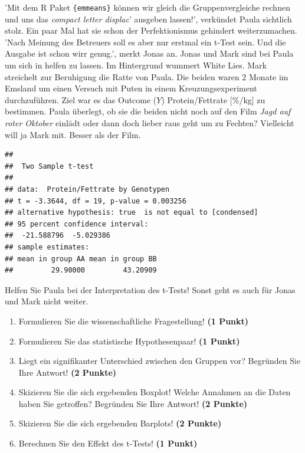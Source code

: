 \documentclass[a4paper, 9pt]{scrartcl}\usepackage[]{graphicx}\usepackage[]{xcolor}
\makeatletter
\newenvironment{kframe}{%
 \def\at@end@of@kframe{}%
 \ifinner\ifhmode%
  \def\at@end@of@kframe{\end{minipage}}%
  \begin{minipage}{\columnwidth}%
 \fi\fi%
 \def\FrameCommand##1{\hskip\@totalleftmargin \hskip-\fboxsep
 \colorbox{shadecolor}{##1}\hskip-\fboxsep
     \hskip-\linewidth \hskip-\@totalleftmargin \hskip\columnwidth}%
 \MakeFramed {\advance\hsize-\width
   \@totalleftmargin\z@ \linewidth\hsize
   \@setminipage}}%
 {\par\unskip\endMakeFramed%
 \at@end@of@kframe}
\newenvironment{knitrout}{}{} %
\makeatother
\begin{document}
'Mit dem R Paket \texttt{\{emmeans\}} können wir gleich die Gruppenvergleiche rechnen und uns das \textit{compact letter displac}' ausgeben lassen!', verkündet Paula sichtlich stolz. Ein paar Mal hat sie schon der Perfektionismus gehindert weiterzumachen. 'Nach Meinung des Betreuers soll es aber nur erstmal ein t-Test sein. Und die Ausgabe ist schon wirr genug.', merkt Jonas an. Jonas und Mark sind bei Paula um sich in \Rlogo helfen zu lassen. Im Hintergrund wummert White Lies. Mark streichelt zur Beruhigung die Ratte von Paula. Die beiden waren 2 Monate im Emsland um einen Versuch mit Puten in einem Kreuzungsexperiment durchzuführen. Ziel war es das Outcome ($Y$) Protein/Fettrate [\%/kg] zu bestimmen. Paula überlegt, ob sie die beiden nicht noch auf den Film \textit{Jagd auf roter Oktober} einlädt oder dann doch lieber raus geht um zu Fechten? Vielleicht will ja Mark mit. Besser als der Film.

\begin{knitrout}
\color{fgcolor}\begin{kframe}
\begin{verbatim}
## 
## 	Two Sample t-test
## 
## data:  Protein/Fettrate by Genotypen
## t = -3.3644, df = 19, p-value = 0.003256
## alternative hypothesis: true  is not equal to [condensed]
## 95 percent confidence interval:
##  -21.588796  -5.029386
## sample estimates:
## mean in group AA mean in group BB 
##         29.90000         43.20909
\end{verbatim}
\end{kframe}
\end{knitrout}

Helfen Sie Paula bei der Interpretation des t-Tests! Sonst geht es auch für Jonas und Mark nicht weiter.
  
\begin{enumerate}
  \item Formulieren Sie die wissenschaftliche Fragestellung! \textbf{(1 Punkt)}
  \item Formulieren Sie das statistische Hypothesenpaar! \textbf{(1 Punkt)}
\item Liegt ein signifikanter Unterschied zwischen den Gruppen vor?
  Begründen Sie Ihre Antwort! \textbf{(2 Punkte)}
\item Skizieren Sie die sich ergebenden Boxplot!
  Welche Annahmen an die Daten haben Sie getroffen? Begründen Sie Ihre
  Antwort! \textbf{(2 Punkte)} 
\item Skizieren Sie die sich ergebenden Barplots! \textbf{(2 Punkte)}
\item Berechnen Sie den Effekt des t-Tests! \textbf{(1 Punkt)}
\end{enumerate}
 
\end{document}
